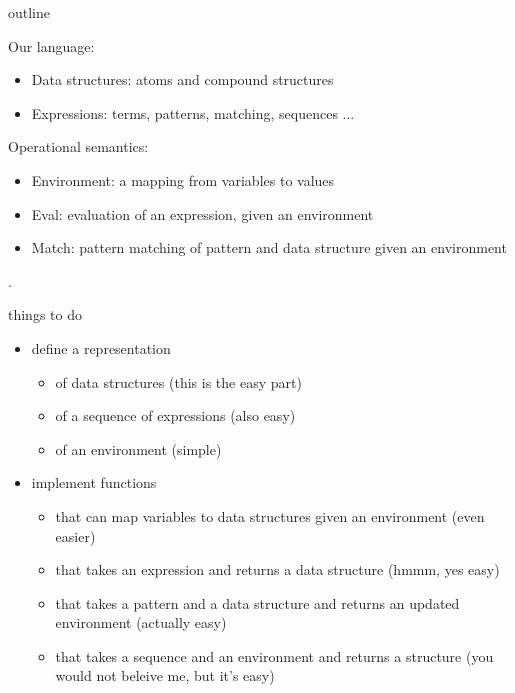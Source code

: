 \begin{frame}{outline}

\pause Our language:

\begin{itemize}
\pause \item Data structures: atoms and compound structures
\pause \item Expressions: terms, patterns, matching, sequences ...
\end{itemize}

\pause Operational semantics:

\begin{itemize}
\pause \item Environment: a mapping from variables to values
\pause \item Eval: evaluation of an expression, given an environment
\pause \item Match: pattern matching of pattern and data structure given an environment
\end{itemize}

.
\end{frame}

\begin{frame}{things to do}

\begin{itemize}
 \pause \item define a representation 
  \begin{itemize}
     \pause \item of data structures (this is the easy part)
     \pause \item of a sequence of expressions (also easy)
     \pause \item of an environment (simple)
  \end{itemize}
 \pause \item implement functions
  \begin{itemize}
    \pause \item that can map variables to data structures given an environment (even easier)
     \pause \item that takes an expression and returns a data structure (hmmm, yes easy)
     \pause \item that takes a pattern and a data structure and returns an updated environment (actually easy)
     \pause \item that takes a sequence and an environment and returns a structure (you would not beleive me, but it's easy)
  \end{itemize}
\end{itemize}

\end{frame}

